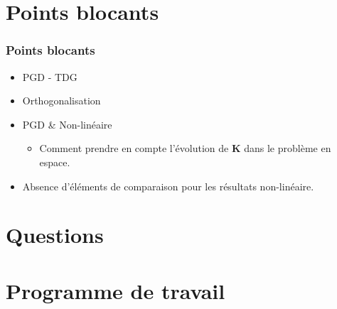 \documentclass[12pt]{beamer}
\begin{document}
\section{Points blocants}

	\begin{frame}
	
		\frametitle{Points blocants}
		\begin{itemize}
			\item PGD - TDG
			\item Orthogonalisation
			\item PGD \& Non-linéaire
				\begin{itemize} 
					\item Comment prendre en compte l'évolution de $ \mathbf{K} $ dans le problème en espace.
				\end{itemize}
			\item Absence d'éléments de comparaison pour les résultats non-linéaire.
		\end{itemize}
	
	\end{frame}

\section{Questions}

%	
%		
%	
	
\section{Programme de travail}
\end{document}
